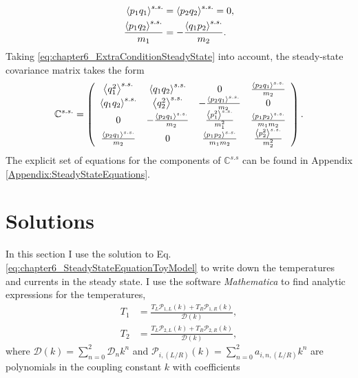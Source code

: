 %
\begin{align}
  \expval{ p_1 q_1}^{s.s.} &= \expval{ p_2 q_2}^{s.s.} = 0,\nonumber\\
  \frac{\expval{ p_1 q_2}^{s.s.}}{m_1}&=-\frac{\expval{ q_1 p_2}^{s.s.}}{m_2}.
  \label{eq:chapter6_ExtraConditionSteadyState}
\end{align}
%
Taking \eqref{eq:chapter6_ExtraConditionSteadyState} into account, the steady-state covariance matrix takes the form
%
\begin{equation}
  \begin{split}
    \mathbb{C}^{s.s.} =
    \left(
    \begin{array}{cccc}
      \expval{ q_1^2}^{s.s.}  & \expval{ q_1 q_2}^{s.s.}  & 0 & \frac{\expval{ p_2 q_1}^{s.s.} }{m_2} \\
      \expval{ q_1 q_2}^{s.s.}  & \expval{ q_2^2}^{s.s.}  & -\frac{\expval{ p_2 q_1}^{s.s.} }{m_2} & 0 \\
      0 & -\frac{\expval{ p_2 q_1}^{s.s.} }{m_2} & \frac{\expval{ p_1^2}^{s.s.} }{m_1^2} & \frac{\expval{ p_1 p_2}^{s.s.} }{m_1 m_2} \\
      \frac{\expval{ p_2 q_1}^{s.s.} }{m_2} & 0 & \frac{\expval{ p_1 p_2}^{s.s.} }{m_1 m_2} & \frac{\expval{ p_2^2}^{s.s.} }{m_2^2} \\
      \end{array}
      \right)
    \end{split}
    \label{eq:chapter6_steadyStateCovarianceMatrix}\,.
\end{equation}
%
The explicit set of equations for the components of $\mathbb{C}^{s.s}$ can be found in Appendix \ref{Appendix:SteadyStateEquations}.
%
%
%
%
%
\section{Solutions\label{sec:solutions}}
%
%
%
%

%
In this section I use the solution to Eq. \eqref{eq:chapter6_SteadyStateEquationToyModel} to write down the temperatures and currents in the steady state. I use the software {\it Mathematica} to find analytic expressions for the temperatures,
%
\begin{align}
  T_1 &= \frac{T_L \mathcal{P}_{1,L}(k) + T_R \mathcal{P}_{1,R}(k)}{\mathcal{D}(k)},\nonumber
  \\
  T_2 &= \frac{T_L \mathcal{P}_{2,L}(k) + T_R \mathcal{P}_{2,R}(k)}{\mathcal{D}(k)},
  \label{eq:chapter6_ModelBTemperatures}
\end{align}
%
where $\mathcal{D}(k) =  \sum\limits_{n=0}^2 \mathcal{D}_n k^n$ and $\mathcal{P}_{i,(L/R)}(k) = \sum\limits_{n=0}^2 a_{i,n,(L/R)} k^n$ are polynomials in the coupling constant $k$ with coefficients
%

